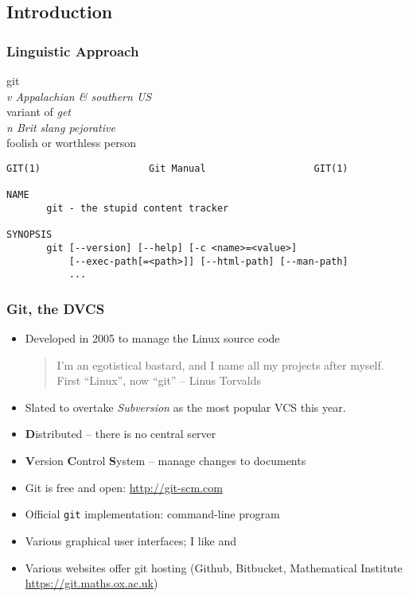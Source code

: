 
\subsection{Introduction}

\begin{frame}[fragile]
  \frametitle{Linguistic Approach}
  
  \begin{block}{}
    git \\
    \textit{v Appalachian \& southern US}\\
    \hspace{1cm} variant of \emph{get}\\
    \textit{n Brit slang pejorative}\\
    \hspace{1cm} foolish or worthless person
  \end{block}
  \bigskip
  \pause

  \small
\begin{verbatim}
GIT(1)                   Git Manual                   GIT(1)

NAME
       git - the stupid content tracker

SYNOPSIS
       git [--version] [--help] [-c <name>=<value>]
           [--exec-path[=<path>]] [--html-path] [--man-path]
           ...
\end{verbatim}

\end{frame}


\begin{frame}
  \frametitle{Git, the DVCS}

  \begin{itemize}
  \item<1->
    Developed in 2005 to manage the Linux source code
    \begin{quote}
      I'm an egotistical bastard, and I name all my projects after
      myself. First ``Linux'', now ``git'' -- Linus Torvalds
    \end{quote}
  \item<2-> Slated to overtake \emph{Subversion} as the most popular VCS
    this year.
  \item<3-> \textbf{D}istributed -- there is no central server
  \item<4-> \textbf{V}ersion \textbf{C}ontrol \textbf{S}ystem -- manage
    changes to documents
  \item<5-> Git is free and open: \url{http://git-scm.com}
  \item<6-> Official \texttt{git} implementation: command-line program
  \item<7-> Various graphical user interfaces; I like  and 
  \item<8-> Various websites offer git hosting (Github, Bitbucket,
    Mathematical Institute \url{https://git.maths.ox.ac.uk})
  \end{itemize}

\end{frame}



